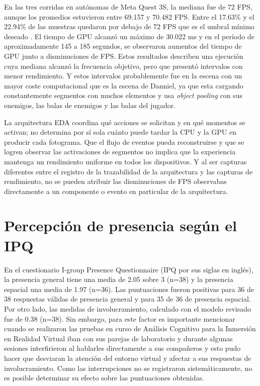 En las tres corridas en autónomas de Meta Quest 3S, la mediana fue de 72 FPS, aunque los promedios estuvieron entre 69.157 y 70.482 FPS. 
Entre el 17.63\% y el 22.94\% de las muestras quedaron por debajo de 72 FPS que es el umbral mínimo deseado \cite{MetaUnityPerf}. 
El tiempo de GPU alcanzó un máximo de 30.022 ms y en el período de aproximadamente 145 a 185 segundos,
se observaron aumentos del tiempo de GPU junto a disminuciones de FPS. 
Estos resultados describen una ejecución cuya mediana alcanzó la frecuencia objetivo, 
pero que presentó intervalos con menor rendimiento. 
Y estos intervalos probablemente fue en la escena con un mayor coste computacional que es la escena de Danniel, ya que esta cargando constantemente segmentos con muchos elementos y usa \emph{object pooling} con sus enemigos, las balas de enemigos y las balas del jugador. 

La arquitectura EDA coordina qué acciones se solicitan y en qué momentos se activan;
no determina por sí sola cuánto puede tardar la CPU y la GPU en producir cada fotograma. 
Que el flujo de eventos pueda reconstruirse y que se logren observar las activaciones de segmentos no implica que la experiencia mantenga un rendimiento uniforme en todos los dispositivos.
Y al ser capturas diferentes entre el registro de la trazabilidad de la arquitectura y las capturas de rendimiento, no se pueden atribuir las disminuciones de FPS observabas directamente a un componente o evento en particular de la arquitectura. 

\section{Percepción de presencia según el IPQ}
En el cuestionario I-group Presence Questionnaire (IPQ por sus siglas en inglés), la presencia general tiene una media de 2.05 sobre 3 (n=38)
y la presencia espacial una media de 1.97 (n=36). 
Las puntuaciones fueron positivas para 36 de 38 respuestas válidas de presencia general y para 35 de 36 de presencia espacial. 
Por otro lado, las medidas de involucramiento, calculado con el modelo revisado \cite{castro2026immersive} fue de 0.38 (n=38).
Sin embargo, para este factor es importante mencionar cuando se realizaron las pruebas en curso de Análisis Cognitivo para la Inmersión en Realidad Virtual iban con sus parejas de laboratorio y durante algunas sesiones interfirieron al hablarles directamente a sus compañeros y esto pudo hacer que desviaran la atención del entorno virtual y afectar a sus respuestas de involucramiento. 
Como las interrupciones no se registraron sistemáticamente, no es posible determinar su efecto sobre las puntuaciones obtenidas.

